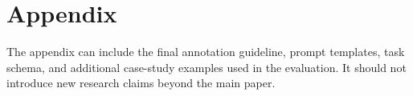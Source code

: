 \section{Appendix}
\label{appendix}

The appendix can include the final annotation guideline, prompt templates, task schema, and additional case-study examples used in the evaluation.
It should not introduce new research claims beyond the main paper.
